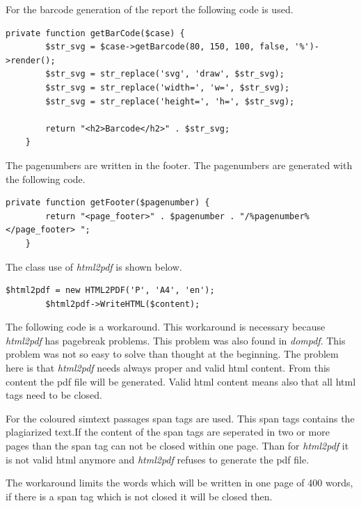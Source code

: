 For the barcode generation of the report the following code is used.

\begin{lstlisting}[caption=Generating the barcode for the report]
  private function getBarCode($case) {
        $str_svg = $case->getBarcode(80, 150, 100, false, '%')->render();
        $str_svg = str_replace('svg', 'draw', $str_svg);
        $str_svg = str_replace('width=', 'w=', $str_svg);
        $str_svg = str_replace('height=', 'h=', $str_svg);

        return "<h2>Barcode</h2>" . $str_svg;
    }
\end{lstlisting}

The pagenumbers are written in the footer. The pagenumbers are generated with the following code.

\begin{lstlisting}[caption=Generating the pagenumbers]
    private function getFooter($pagenumber) {
        return "<page_footer>" . $pagenumber . "/%pagenumber%</page_footer> ";
    }
\end{lstlisting}

The class use of \textit{html2pdf} is shown below.

\begin{lstlisting}[caption=Use of the class html2pdf]
        $html2pdf = new HTML2PDF('P', 'A4', 'en');
        $html2pdf->WriteHTML($content);
\end{lstlisting}

The following code is a workaround. This workaround is necessary because \textit{html2pdf} has pagebreak problems. This problem was also found in \textit{dompdf}. This problem was not so easy to solve than thought at the beginning. The problem here is that  \textit{html2pdf} needs always proper and valid html content. From this content the pdf file will be generated. Valid html content means also that all html tags need to be closed. 

For the coloured simtext passages span tags are used. This span tags contains the plagiarized text.If the content of the span tags are seperated in two or more pages than the span tag can not be closed within one page. Than for \textit{html2pdf} it is not valid html anymore and \textit{html2pdf} refuses to generate the pdf file.

The workaround limits the words which will be written in one page of 400 words, if there is a span tag which is not closed it will be closed then.

